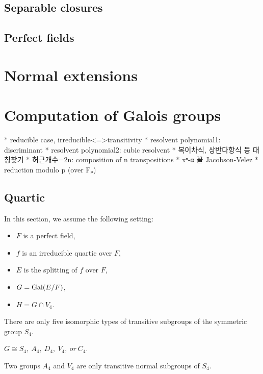 \documentclass{../exp}
\begin{document}
\begin{rd}
\subsection{Separable closures}





\subsection{Perfect fields}









\section{Normal extensions}










\section{Computation of Galois groups}

 * reducible case, irreducible<=>transitivity
 * resolvent polynomial1: discriminant
 * resolvent polynomial2: cubic resolvent
 * 복이차식, 상반다항식 등 대칭찾기
 * 허근개수=2n: composition of n transpositions
 * xⁿ-α 꼴  Jacobson-Velez
 * reduction modulo p (over Fₚ)

\subsection{Quartic}
In this section, we assume the following setting:
\begin{itemize}
\item $F$ is a perfect field, %
\item $f$ is an irreducible quartic over $F$,
\item $E$ is the splitting of $f$ over $F$,
\item $G=\operatorname{Gal}(E/F)$,
\item $H=G\cap V_4$. 
\end{itemize}
\begin{thm}
There are only five isomorphic types of transitive subgroups of the symmetric group $S_4$.
\end{thm}
\begin{cor}
$G\cong S_4,\ A_4,\ D_4,\ V_4,\ or\ C_4$.
\end{cor}
\begin{prop}
Two groups $A_4$ and $V_4$ are only transitive normal subgroups of $S_4$.
\end{prop}


\end{rd}
\end{document}
